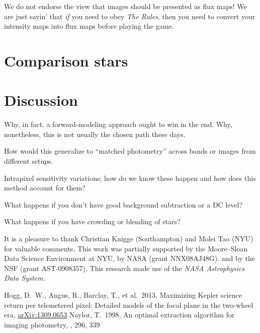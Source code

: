 \documentclass[12pt, letterpaper, preprint]{aastex}
\newcommand{\project}[1]{\textsl{#1}}
\newcommand{\foreign}[1]{\textsl{#1}}
\newcommand{\etal}{\foreign{et\,al.}}
\begin{document}
We do not endorse the view that images should be presented as flux maps!
We are just sayin' that \emph{if} you need to obey \emph{The Rules},
  then you need to convert your intensity maps into flux maps before playing the game.

\section{Comparison stars}

\section{Discussion}

Why, in fact, a forward-modeling approach ought to win in the end.
Why, nonetheless, this is not usually the chosen path these days.

How would this generalize to ``matched photometry'' across bands or images from different setups.

Intrapixel sensitivity variations;
  how do we know these happen and how does this method account for them?

What happens if you don't have good background subtraction or a DC level?

What happens if you have crowding or blending of stars?

\acknowledgments
It is a pleasure to thank
  Christian Knigge (Southampton) and
  Molei Tao (NYU)
for valuable comments.
This work was partially supported by the Moore--Sloan Data Science Environment at NYU,
  by NASA (grant NNX08AJ48G).
  and by the NSF (grant AST-0908357).
This research made use of the \project{NASA Astrophysics Data System}.

\newcommand{\arxiv}[1]{\href{http://arxiv.org/abs/#1}{arXiv:#1}}
\begin{thebibliography}{}\raggedright
\bibitem[Hogg \etal(2013)]{hoggwhitepaper}
Hogg, D.~W., Angus, R., Barclay, T., et al.\ 2013,
Maximizing Kepler science return per telemetered pixel: Detailed models of the focal plane in the two-wheel era,
\arxiv{1309.0653}
Naylor, T.\ 1998,
An optimal extraction algorithm for imaging photometry,
\mnras, 296, 339
\end{thebibliography}
\end{document}
